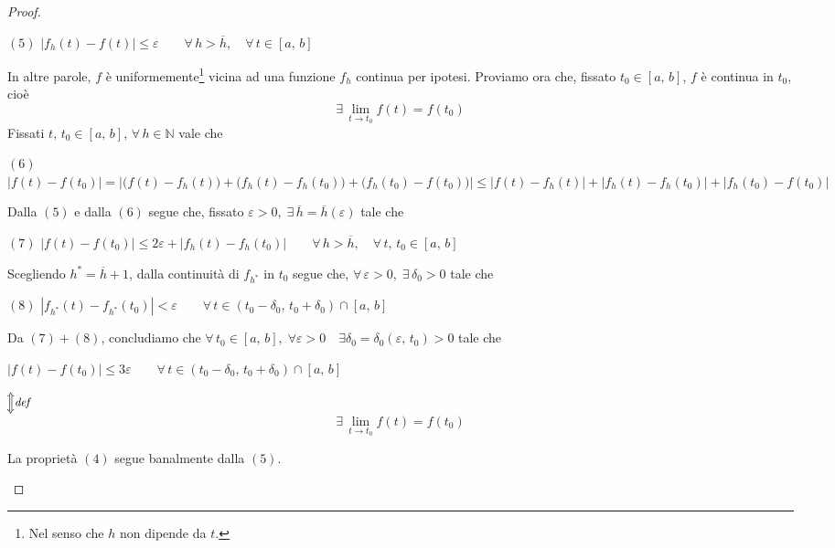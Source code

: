 \begin{proof}
\begin{enumerate}[labelindent=\parindent,leftmargin=*,label=\textnormal{(\roman*)},start=1]
\begin{center}
$\mathrm{(5)}$
\hfill
$\displaystyle
\left| f_h(t)-f(t) \right| \leq \varepsilon \qquad \forall \, h > \overline{h}, \quad \forall \, t \in [a,\,b]
$
\hfill \null \\
\end{center}
In altre parole, $f$ è uniformemente\footnote{Nel senso che $h$ non dipende da $t$.} vicina ad una funzione $f_h$ continua per ipotesi. Proviamo ora che, fissato $t_0 \in [a,\,b]$, $f$ è continua in $t_0$, cioè
$$
\exists \, \lim_{t \rightarrow t_0} f(t) = f(t_0)
$$
Fissati $t,\,t_0 \in [a,\,b]$, $\forall \, h \in \mathbb{N}$ vale che
\begin{center}
$\mathrm{(6)}$
\hfill
$\displaystyle
|f(t)-f(t_0)| = 
\left| \big(f(t)-f_h(t)\big)+\big(f_h(t)-f_h(t_0)\big)+\big(f_h(t_0)-f(t_0)\big) \right| \leq
|f(t)-f_h(t)| + |f_h(t)-f_h(t_0)| + |f_h(t_0)-f(t_0)|
$
\hfill \null \\
\end{center}
Dalla $\mathrm{(5)}$ e dalla $\mathrm{(6)}$ segue che, fissato $\varepsilon > 0, \; \exists \, \overline{h} = \overline{h}(\varepsilon)$ tale che
\begin{center}
$\mathrm{(7)}$
\hfill
$\displaystyle
|f(t)-f(t_0)| \leq 2\varepsilon + |f_h(t)-f_h(t_0)| \qquad \forall \, h > \overline{h}, \quad \forall \, t,\,t_0 \in [a,\,b]
$
\hfill \null \\
\end{center}
Scegliendo $h^* = \overline{h}+1$, dalla continuità di $f_{h^*}$ in $t_0$ segue che, $\forall \, \varepsilon > 0, \; \exists \, \delta_0 > 0$ tale che
\begin{center}
$\mathrm{(8)}$
\hfill
$\displaystyle
|f_{h^*}(t)-f_{h^*}(t_0)| < \varepsilon \qquad \forall \, t \in (t_0-\delta_0,\,t_0+\delta_0) \cap [a,\,b]
$
\hfill \null \\
\end{center}
Da $\mathrm{(7)}+\mathrm{(8)}$, concludiamo che $\forall \, t_0 \in [a,\,b], \; \forall \varepsilon > 0 \quad \exists \delta_0 = \delta_0(\varepsilon,\,t_0) > 0$ tale che
\begin{center}
$ \displaystyle
|f(t) - f(t_0)| \leq 3\varepsilon \qquad \forall \, t \in (t_0-\delta_0,\,t_0+\delta_0) \cap [a,\,b]
$\\
$ \displaystyle
\rotatebox{270}{$\overset{\rotatebox{90}{\footnotesize \textit{def}}}{\Longleftrightarrow}$}
$\\
$$
\exists \, \lim_{t \rightarrow t_0} f(t) = f(t_0)
$$
\end{center}
La proprietà $\mathrm{(4)}$ segue banalmente dalla $\mathrm{(5)}$.
\end{enumerate}
\end{proof}


